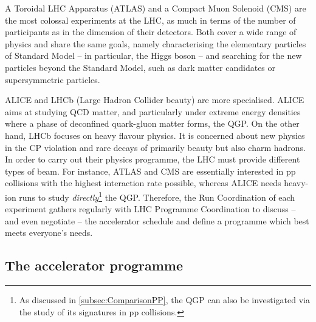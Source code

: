 A Toroidal LHC Apparatus (ATLAS) and a Compact Muon Solenoid (CMS) are the most colossal experiments at the LHC, as much in terms of the number of participants as in the dimension of their detectors. Both cover a wide range of physics and share the same goals, namely characterising the elementary particles of Standard Model -- in particular, the Higgs boson -- and searching for the new particles beyond the Standard Model, such as dark matter candidates or supersymmetric particles. 

ALICE and LHCb (Large Hadron Collider beauty) are more specialised. ALICE aims at studying QCD matter, and particularly under extreme energy densities where a phase of deconfined quark-gluon matter forms, the QGP. On the other hand, LHCb focuses on heavy flavour physics. It is concerned about new physics in the CP violation and rare decays of primarily beauty but also charm hadrons.\\

In order to carry out their physics programme, the LHC must provide different types of beam. For instance, ATLAS and CMS are essentially interested in pp collisions with the highest interaction rate possible, whereas ALICE needs heavy-ion runs to study \textit{directly}\footnote{As discussed in \Sec\ref{subsec:ComparisonPP}, the QGP can also be investigated via the study of its signatures in pp collisions.} the QGP. Therefore, the Run Coordination of each experiment gathers regularly with LHC Programme Coordination to discuss -- and even negotiate -- the accelerator schedule and define a programme which best meets everyone's needs.

\subsection{The accelerator programme}


